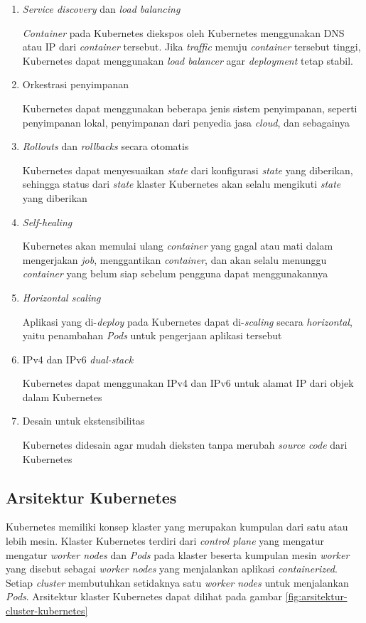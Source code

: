 \begin{enumerate}
  \item{\emph{Service discovery} dan \emph{load balancing}}
    \par{\emph{Container} pada Kubernetes diekspos oleh Kubernetes menggunakan DNS atau IP dari
      \emph{container} tersebut. Jika \emph{traffic} menuju \emph{container} tersebut tinggi, Kubernetes
      dapat menggunakan \emph{load balancer} agar \emph{deployment} tetap stabil.
    }
  \item{Orkestrasi penyimpanan}
    \par{Kubernetes dapat menggunakan beberapa jenis sistem penyimpanan, seperti
      penyimpanan lokal, penyimpanan dari penyedia jasa \emph{cloud}, dan sebagainya
    }
  \item{\emph{Rollouts} dan \emph{rollbacks} secara otomatis}
    \par{Kubernetes dapat menyesuaikan \emph{state} dari konfigurasi \emph{state} yang
      diberikan, sehingga status dari \emph{state} klaster Kubernetes akan selalu mengikuti
      \emph{state} yang diberikan
    }
  \item{\emph{Self-healing}}
    \par{Kubernetes akan memulai ulang \emph{container} yang gagal atau mati dalam
      mengerjakan \emph{job}, menggantikan \emph{container}, dan akan selalu menunggu
      \emph{container} yang belum siap sebelum pengguna dapat menggunakannya
    }
  \item{\emph{Horizontal scaling}}
    \par{Aplikasi yang di-\emph{deploy} pada Kubernetes dapat di-\emph{scaling} secara
      \emph{horizontal}, yaitu penambahan \emph{Pods} untuk pengerjaan aplikasi tersebut
    }
  \item{IPv4 dan IPv6 \emph{dual-stack}}
    \par{Kubernetes dapat menggunakan IPv4 dan IPv6 untuk alamat IP dari objek dalam Kubernetes
    }
  \item{Desain untuk ekstensibilitas}
    \par{Kubernetes didesain agar mudah dieksten tanpa merubah \emph{source code} dari Kubernetes
    }
\end{enumerate}

\subsection{Arsitektur Kubernetes}

Kubernetes memiliki konsep klaster yang merupakan kumpulan dari satu atau
lebih mesin. Klaster Kubernetes terdiri dari \emph{control plane} yang mengatur
mengatur \emph{worker nodes} dan \emph{Pods} pada klaster
beserta kumpulan mesin \emph{worker} yang disebut sebagai \emph{worker nodes} yang 
menjalankan aplikasi \emph{containerized}. Setiap \emph{cluster} membutuhkan
setidaknya satu \emph{worker nodes} untuk menjalankan \emph{Pods}. Arsitektur
klaster Kubernetes dapat dilihat pada gambar \ref{fig:arsitektur-cluster-kubernetes}

